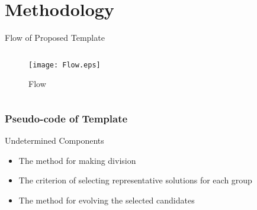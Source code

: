 \section{Methodology}

\begin{frame}{Flow of Proposed Template}
  \begin{columns}
    \begin{column}{0.9\textwidth}
      \begin{figure}[b]
        \vspace*{1cm}        
        \texttt{[image: Flow.eps]}\hspace*{2cm}
        \caption{Flow}
      \end{figure}
    \end{column}
  \end{columns}
\end{frame}

\begin{frame}
  \frametitle{Pseudo-code of Template}

\end{frame}   

\begin{frame}{Undetermined Components}
  \begin{itemize}
    \item The method for making division
      \vspace*{14pt}
    \item The criterion of selecting representative solutions for
      each group
      \vspace*{14pt}
    \item The method for evolving the selected candidates
  \end{itemize}
\end{frame}

